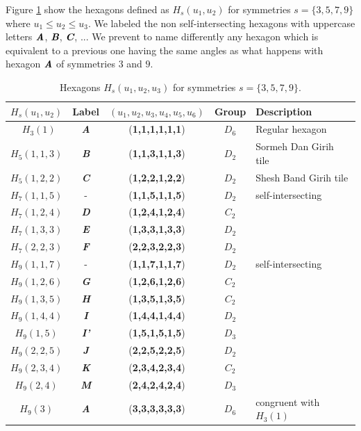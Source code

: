 \documentclass[11pt]{article}
\def\mathbi#1{\textbf{\em #1}}
\begin{document}
Figure \ref{tbl:hexagons-angles} show the hexagons defined as $H_s(u_1,u_2)$ for symmetries $s = \{3,5,7,9\}$ where $u_1 \leq u_2 \leq u_3$. We labeled the non self-intersecting hexagons with uppercase letters $\mathbi{A}$, $\mathbi{B}$, $\mathbi{C}$, ... We prevent to name differently any hexagon which is equivalent to a previous one having the same angles as what happens with hexagon $\mathbi{A}$ of symmetries $3$ and $9$.

\begin{table}[H]
\begin{center}
\begin{tabular}{| c | c | c | c | l | }
\hline
$H_s(u_1,u_2)$ & Label & $(u_1,u_2,u_3,u_4,u_5,u_6)$ & Group & Description \\ \hline\
$H_3(1)$   & \mathbi{A} & (\textbf{1,1,1,1,1,1}) & $D_6$ & Regular hexagon \\[0.5ex]
\hline
$H_5(1,1,3)$ & \mathbi{B} & (\textbf{1,1,3,1,1,3}) & $D_2$ & Sormeh Dan Girih tile\\[0.5ex]
$H_5(1,2,2)$ & \mathbi{C} & (\textbf{1,2,2,1,2,2}) & $D_2$ & Shesh Band Girih tile\\[0.5ex]
\hline
$H_7(1,1,5)$ & -          & (\textbf{1,1,5,1,1,5}) & $D_2$ & self-intersecting \\[0.5ex]
$H_7(1,2,4)$ & \mathbi{D} & (\textbf{1,2,4,1,2,4}) & $C_2$ & \\[0.5ex]
$H_7(1,3,3)$ & \mathbi{E} & (\textbf{1,3,3,1,3,3}) & $D_2$ & \\[0.5ex]
$H_7(2,2,3)$ & \mathbi{F} & (\textbf{2,2,3,2,2,3}) & $D_2$ & \\[0.5ex]
\hline
$H_9(1,1,7)$ & -           & (\textbf{1,1,7,1,1,7}) & $D_2$ & self-intersecting \\[0.5ex]
$H_9(1,2,6)$ & \mathbi{G}  & (\textbf{1,2,6,1,2,6}) & $C_2$ & \\[0.5ex]
$H_9(1,3,5)$ & \mathbi{H}  & (\textbf{1,3,5,1,3,5}) & $C_2$ & \\[0.5ex]
$H_9(1,4,4)$ & \mathbi{I}  & (\textbf{1,4,4,1,4,4}) & $D_2$ & \\[0.5ex]
$H_9(1,5)$   & \mathbi{I'} & (\textbf{1,5,1,5,1,5}) & $D_3$ & \\[0.5ex]
$H_9(2,2,5)$ & \mathbi{J}  & (\textbf{2,2,5,2,2,5}) & $D_2$ & \\[0.5ex]
$H_9(2,3,4)$ & \mathbi{K}  & (\textbf{2,3,4,2,3,4}) & $C_2$ & \\[0.5ex]
$H_9(2,4)$   & \mathbi{M} & (\textbf{2,4,2,4,2,4}) & $D_3$ & \\[0.5ex]
$H_9(3)$     & \mathbi{A} & (\textbf{3,3,3,3,3,3}) & $D_6$  & congruent with $H_3(1)$\\[0.5ex]
\hline
\end{tabular}
\caption{Hexagons $H_s(u_1,u_2,u_3)$ for symmetries $s = \{3,5,7,9\}$.} 
\label{tbl:hexagons-angles}
\end{center}
\end{table}
\end{document}
